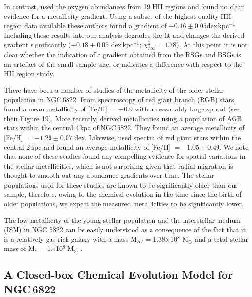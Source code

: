 \documentclass[iop]{emulateapj}
\begin{document}
In contrast,
\cite{2006ApJ...642..813L} used the oxygen abundances from 19 HII
regions and found no clear evidence for a metallicity gradient.
Using a subset of the highest quality HII
region data available these authors found a gradient of
$-0.16\pm0.05$dex\,kpc$^{-1}$.
Including these results into our analysis degrades the fit and changes the derived gradient significantly
($-0.18\pm0.05$ dex\,kpc$^{-1}$; $\chi^{2}_{red}=1.78$).
At this point it is not clear whether the indication of a gradient obtained from the RSGs and BSGs is an artefact of the small sample size,
or indicates a difference with respect to the HII region study.


There have been a number of studies of the metallicity of the older stellar population in NGC\,6822.
From spectroscopy of red giant branch (RGB) stars,
\cite{2001MNRAS.327..918T} found a mean metallicity of [Fe/H] $=-0.9$
with a reasonably large spread (see their Figure 19).
More recently,
\cite{2012A&A...540A.135S} derived metallicities using a population of AGB stars within the central 4\,kpc of NGC\,6822.
They found an average metallicity of [Fe/H] $=-1.29\pm0.07$ dex.
Likewise,
\cite{2013ApJ...779..102K}
used spectra of red giant stars within the central 2\,kpc and found an average metallicity of
[Fe/H] $=-1.05\pm0.49$.
We note that none of these studies found any compelling evidence for spatial variations in the stellar metallicities,
which is not surprising given that radial migration is thought to smooth out any abundance gradients over time.
The stellar populations used for these studies are known to be significantly older than our sample,
therefore, owing to the chemical evolution in the time since the birth of older populations,
we expect the measured metallicities to be significantly lower.

The low metallicity of the young stellar population and the interstellar medium (ISM) in NGC 6822 can be easily understood as a consequence of the fact that it is a relatively gas-rich galaxy with a mass
M$_{HI}$ = 1.38$\times$10$^{8}$ M$_{\odot}$
\citep{2004AJ....128...16K} and a total stellar mass of
M$_{*}$ = 1$\times$10$^{8}$ M$_{\odot}$
\citep{2014ApJ...789..147W}.

\subsection{A Closed-box Chemical Evolution Model for NGC\,6822} %
\label{sub:a_closed_box_chemical_evolution_model_for_ngc,6822}
\end{document}

